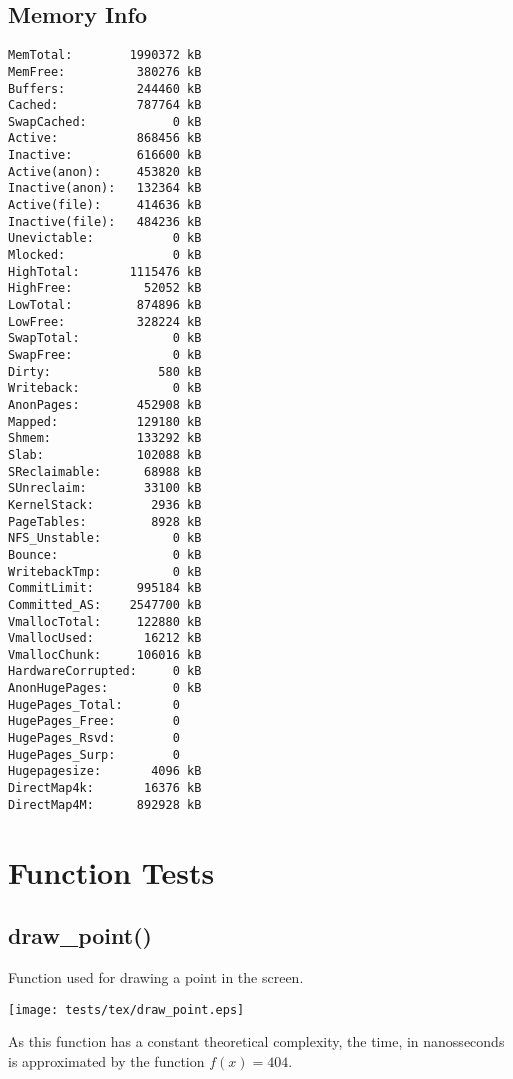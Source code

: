 \documentclass{article}
\begin{document}
\subsection{Memory Info}
\begin{verbatim}
MemTotal:        1990372 kB
MemFree:          380276 kB
Buffers:          244460 kB
Cached:           787764 kB
SwapCached:            0 kB
Active:           868456 kB
Inactive:         616600 kB
Active(anon):     453820 kB
Inactive(anon):   132364 kB
Active(file):     414636 kB
Inactive(file):   484236 kB
Unevictable:           0 kB
Mlocked:               0 kB
HighTotal:       1115476 kB
HighFree:          52052 kB
LowTotal:         874896 kB
LowFree:          328224 kB
SwapTotal:             0 kB
SwapFree:              0 kB
Dirty:               580 kB
Writeback:             0 kB
AnonPages:        452908 kB
Mapped:           129180 kB
Shmem:            133292 kB
Slab:             102088 kB
SReclaimable:      68988 kB
SUnreclaim:        33100 kB
KernelStack:        2936 kB
PageTables:         8928 kB
NFS_Unstable:          0 kB
Bounce:                0 kB
WritebackTmp:          0 kB
CommitLimit:      995184 kB
Committed_AS:    2547700 kB
VmallocTotal:     122880 kB
VmallocUsed:       16212 kB
VmallocChunk:     106016 kB
HardwareCorrupted:     0 kB
AnonHugePages:         0 kB
HugePages_Total:       0
HugePages_Free:        0
HugePages_Rsvd:        0
HugePages_Surp:        0
Hugepagesize:       4096 kB
DirectMap4k:       16376 kB
DirectMap4M:      892928 kB
\end{verbatim}
\section{Function Tests}
\subsection{draw\_point()}
Function used for drawing a point in the screen.


\texttt{[image: tests/tex/draw\_point.eps]}

As this function has a constant theoretical
complexity, the time, in nanosseconds is 
approximated by the function $f(x)=404$.
\end{document}
